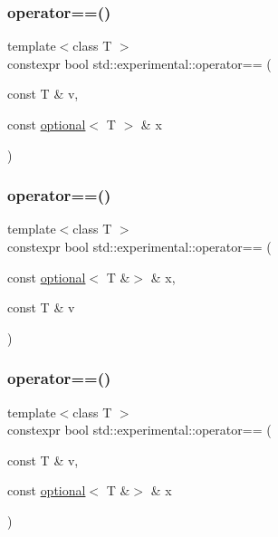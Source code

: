 \mbox{\label{namespacestd_1_1experimental_a1958e649d145d612bc04a821d28c0ffb}} 
\subsubsection{\texorpdfstring{operator==()}{operator==()}\hspace{0.1cm}{\footnotesize\ttfamily [5/9]}}
{\footnotesize\ttfamily template$<$class T $>$ \\
constexpr bool std\+::experimental\+::operator== (\begin{DoxyParamCaption}\item[{const T \&}]{v,  }\item[{const \hyperlink{classstd_1_1experimental_1_1optional}{optional}$<$ T $>$ \&}]{x }\end{DoxyParamCaption})}

\mbox{\label{namespacestd_1_1experimental_a5e8049d714e136368d3f1cc2cc7fc787}} 
\subsubsection{\texorpdfstring{operator==()}{operator==()}\hspace{0.1cm}{\footnotesize\ttfamily [6/9]}}
{\footnotesize\ttfamily template$<$class T $>$ \\
constexpr bool std\+::experimental\+::operator== (\begin{DoxyParamCaption}\item[{const \hyperlink{classstd_1_1experimental_1_1optional}{optional}$<$ T \&$>$ \&}]{x,  }\item[{const T \&}]{v }\end{DoxyParamCaption})}

\mbox{\label{namespacestd_1_1experimental_ad874f9e082998b503ad0f7bb0376782e}} 
\subsubsection{\texorpdfstring{operator==()}{operator==()}\hspace{0.1cm}{\footnotesize\ttfamily [7/9]}}
{\footnotesize\ttfamily template$<$class T $>$ \\
constexpr bool std\+::experimental\+::operator== (\begin{DoxyParamCaption}\item[{const T \&}]{v,  }\item[{const \hyperlink{classstd_1_1experimental_1_1optional}{optional}$<$ T \&$>$ \&}]{x }\end{DoxyParamCaption})}

